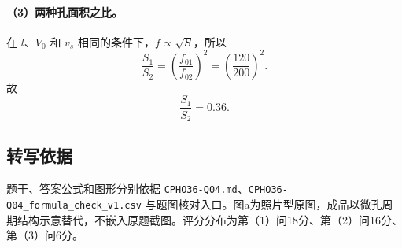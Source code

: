 \paragraph{（3）两种孔面积之比。} 在 $l$、$V_0$ 和 $v_s$ 相同的条件下，$f\propto\sqrt S$，所以
\[
\frac{S_1}{S_2}=\left(\frac{f_{01}}{f_{02}}\right)^2
=\left(\frac{120}{200}\right)^2.
\]
故
\[
\boxed{\frac{S_1}{S_2}=0.36.}
\]

\subsection{转写依据}
题干、答案公式和图形分别依据 \texttt{CPHO36-Q04.md}、\texttt{CPHO36-Q04\_formula\_check\_v1.csv} 与题图核对入口。图a为照片型原图，成品以微孔周期结构示意替代，不嵌入原题截图。评分分布为第（1）问18分、第（2）问16分、第（3）问6分。
